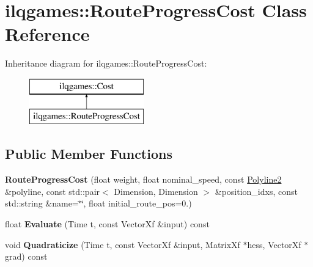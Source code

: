 \hypertarget{classilqgames_1_1_route_progress_cost}{}\section{ilqgames\+:\+:Route\+Progress\+Cost Class Reference}
\label{classilqgames_1_1_route_progress_cost}
Inheritance diagram for ilqgames\+:\+:Route\+Progress\+Cost\+:\begin{figure}[H]
\begin{center}
\leavevmode
\includegraphics[height=2.000000cm]{classilqgames_1_1_route_progress_cost}
\end{center}
\end{figure}
\subsection*{Public Member Functions}
\begin{DoxyCompactItemize}
\item 
{\bfseries Route\+Progress\+Cost} (float weight, float nominal\+\_\+speed, const \hyperlink{classilqgames_1_1_polyline2}{Polyline2} \&polyline, const std\+::pair$<$ Dimension, Dimension $>$ \&position\+\_\+idxs, const std\+::string \&name=\char`\"{}\char`\"{}, float initial\+\_\+route\+\_\+pos=0.)\hypertarget{classilqgames_1_1_route_progress_cost_a9bc119604ce84627367f7e943e28a90d}{}\label{classilqgames_1_1_route_progress_cost_a9bc119604ce84627367f7e943e28a90d}

\item 
float {\bfseries Evaluate} (Time t, const Vector\+Xf \&input) const \hypertarget{classilqgames_1_1_route_progress_cost_a93a76046fac60030e3f8767c0b8efea0}{}\label{classilqgames_1_1_route_progress_cost_a93a76046fac60030e3f8767c0b8efea0}

\item 
void {\bfseries Quadraticize} (Time t, const Vector\+Xf \&input, Matrix\+Xf $\ast$hess, Vector\+Xf $\ast$grad) const \hypertarget{classilqgames_1_1_route_progress_cost_a51ac030f155eafcf5c7f52ee7220ec4f}{}\label{classilqgames_1_1_route_progress_cost_a51ac030f155eafcf5c7f52ee7220ec4f}

\end{DoxyCompactItemize}
